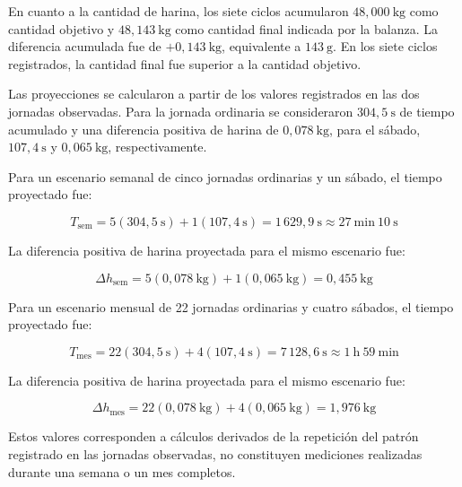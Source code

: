 En cuanto a la cantidad de harina, los siete ciclos acumularon
$48{,}000\ \mathrm{kg}$ como cantidad objetivo y
$48{,}143\ \mathrm{kg}$ como cantidad final indicada por la balanza.
La diferencia acumulada fue de $+0{,}143\ \mathrm{kg}$, equivalente a
$143\ \mathrm{g}$. En los siete ciclos registrados, la cantidad final fue
superior a la cantidad objetivo.

Las proyecciones se calcularon a partir de los valores registrados en las dos
jornadas observadas. Para la jornada ordinaria se consideraron
$304{,}5\ \mathrm{s}$ de tiempo acumulado y una diferencia positiva de harina
de $0{,}078\ \mathrm{kg}$, para el sábado, $107{,}4\ \mathrm{s}$ y
$0{,}065\ \mathrm{kg}$, respectivamente.

Para un escenario semanal de cinco jornadas ordinarias y un sábado, el tiempo
proyectado fue:

\begin{equation*}
T_{\mathrm{sem}}
=
5(304{,}5\ \mathrm{s})
+
1(107{,}4\ \mathrm{s})
=
1\,629{,}9\ \mathrm{s}
\approx
27\ \mathrm{min}\ 10\ \mathrm{s}
\end{equation*}

La diferencia positiva de harina proyectada para el mismo escenario fue:

\begin{equation*}
\Delta h_{\mathrm{sem}}
=
5(0{,}078\ \mathrm{kg})
+
1(0{,}065\ \mathrm{kg})
=
0{,}455\ \mathrm{kg}
\end{equation*}

Para un escenario mensual de 22 jornadas ordinarias y cuatro sábados, el
tiempo proyectado fue:

\begin{equation*}
T_{\mathrm{mes}}
=
22(304{,}5\ \mathrm{s})
+
4(107{,}4\ \mathrm{s})
=
7\,128{,}6\ \mathrm{s}
\approx
1\ \mathrm{h}\ 59\ \mathrm{min}
\end{equation*}

La diferencia positiva de harina proyectada para el mismo escenario fue:

\begin{equation*}
\Delta h_{\mathrm{mes}}
=
22(0{,}078\ \mathrm{kg})
+
4(0{,}065\ \mathrm{kg})
=
1{,}976\ \mathrm{kg}
\end{equation*}

Estos valores corresponden a cálculos derivados de la repetición del patrón
registrado en las jornadas observadas, no constituyen mediciones realizadas
durante una semana o un mes completos.


